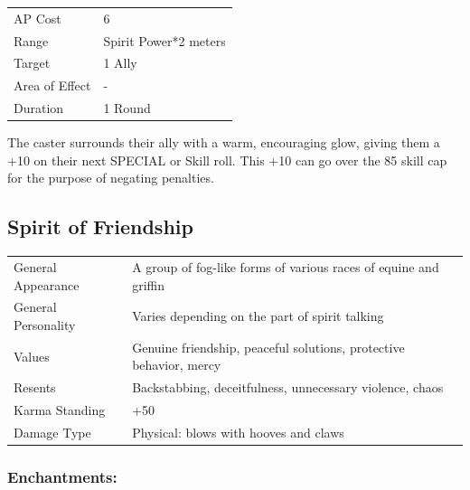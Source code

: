 \documentclass[11pt,a4paper,twocolumn]{book}
\begin{document}
\smallskip
{
	\begin{tabu} to 70mm{| X[l,4] | X[l,7] |}
		\hline
        AP Cost	      	& 6 					\\
        Range     		& Spirit Power*2 meters	\\
        Target      	& 1 Ally				\\
        Area of Effect  & -  	 				\\
        Duration     	& 1 Round				\\ \hline
	\end{tabu}
		
}

\medskip

The caster surrounds their ally with a warm, encouraging glow, giving them a +10 on their next SPECIAL or Skill roll. This +10 can go over the 85 skill cap for the purpose of negating penalties.

\vfill


\subsection*{Spirit of Friendship}
{
	\begin{tabu} to 75mm{| X[l,4] | X[l,8] |}
		\hline
		General Appearance		& A group of fog-like forms of various races of equine and griffin		\\
        General Personality	   	& Varies depending on the part of spirit talking						\\
        Values     				& Genuine friendship, peaceful solutions, protective behavior, mercy	\\
        Resents     			& Backstabbing, deceitfulness, unnecessary violence, chaos 				\\
        Karma Standing      	& +50																	\\
        Damage Type 			& Physical: blows with hooves and claws	 								\\ \hline
	\end{tabu}
		
}

\medskip
\subsubsection*{Enchantments:}
\end{document}
